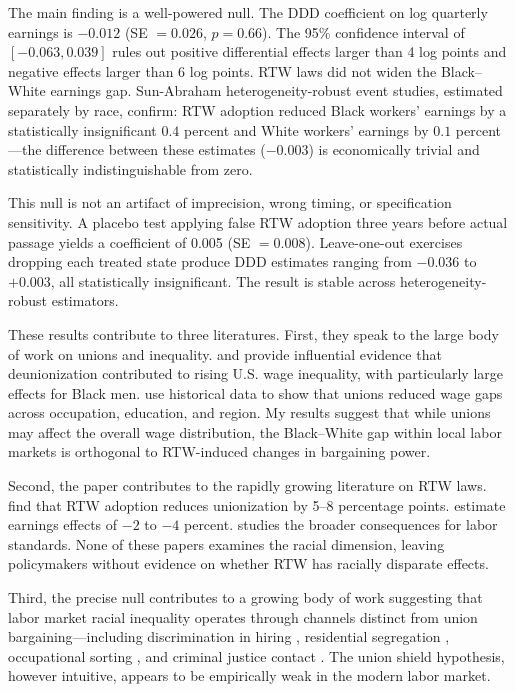 \documentclass[12pt]{article}
\begin{document}
The main finding is a well-powered null. The DDD coefficient on log quarterly earnings is $-0.012$ (SE $= 0.026$, $p = 0.66$). The 95\% confidence interval of $[-0.063, 0.039]$ rules out positive differential effects larger than 4 log points and negative effects larger than 6 log points. RTW laws did not widen the Black--White earnings gap. Sun-Abraham heterogeneity-robust event studies, estimated separately by race, confirm: RTW adoption reduced Black workers' earnings by a statistically insignificant $0.4$ percent and White workers' earnings by $0.1$ percent---the difference between these estimates ($-0.003$) is economically trivial and statistically indistinguishable from zero.

This null is not an artifact of imprecision, wrong timing, or specification sensitivity. A placebo test applying false RTW adoption three years before actual passage yields a coefficient of 0.005 (SE $= 0.008$). Leave-one-out exercises dropping each treated state produce DDD estimates ranging from $-0.036$ to $+0.003$, all statistically insignificant. The result is stable across heterogeneity-robust estimators.

These results contribute to three literatures. First, they speak to the large body of work on unions and inequality. \citet{card1996effect} and \citet{western2011unions} provide influential evidence that deunionization contributed to rising U.S. wage inequality, with particularly large effects for Black men. \citet{farber2021unions} use historical data to show that unions reduced wage gaps across occupation, education, and region. My results suggest that while unions may affect the overall wage distribution, the Black--White gap within local labor markets is orthogonal to RTW-induced changes in bargaining power.

Second, the paper contributes to the rapidly growing literature on RTW laws. \citet{fortin2022right} find that RTW adoption reduces unionization by 5--8 percentage points. \citet{collins2024right} estimate earnings effects of $-2$ to $-4$ percent. \citet{zullo2011right} studies the broader consequences for labor standards. None of these papers examines the racial dimension, leaving policymakers without evidence on whether RTW has racially disparate effects.

Third, the precise null contributes to a growing body of work suggesting that labor market racial inequality operates through channels distinct from union bargaining---including discrimination in hiring \citep{bertrand2004emily, kline2022systemic}, residential segregation \citep{cutler1999rise}, occupational sorting \citep{altonji1999race}, and criminal justice contact \citep{mueller2021racial}. The union shield hypothesis, however intuitive, appears to be empirically weak in the modern labor market.
\end{document}
